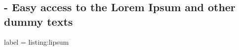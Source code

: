 
\subsection{ - Easy access to the Lorem Ipsum and other dummy texts}

\begin{tcblisting}{label = listing:lipsum}
  \lipsum[1]
\end{tcblisting}
